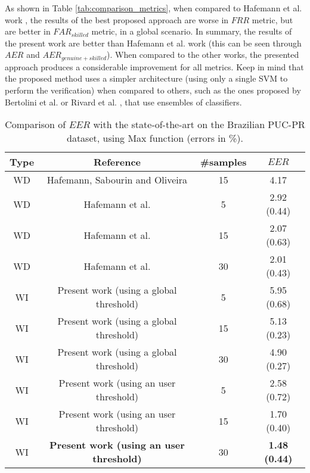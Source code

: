 \documentclass[conference]{IEEEtran}
\begin{document}
As shown in Table \ref{tab:comparison_metrics}, when compared to Hafemann et al. work \cite{hafemann:17}, the results of the best proposed approach are worse in $FRR$ metric, but are better in  $FAR_{skilled}$ metric, in a global scenario. In summary, the results of the present work are better than Hafemann et al. work \cite{hafemann:17} (this can be seen through $AER$ and $AER_{genuine+skilled}$). 
When compared to the other works, the presented approach produces a considerable improvement for all metrics. Keep in mind that the proposed method uses a simpler architecture (using only a single SVM to perform the verification) when compared to others, such as the ones proposed by Bertolini et al. \cite{bertolini:10} or Rivard et al. \cite{rivard:13}, that use ensembles of classifiers.


\begin{table}[!htb]
\caption{Comparison of $EER$ with the state-of-the-art on the Brazilian PUC-PR dataset, using Max function (errors in \%).}
\label{tab:comparison_ERR_userthreshold}
\scriptsize
\centering

\begin{tabular}{cccc}
\hline
Type & Reference & \#samples & $EER$ \\ 
\hline
WD & Hafemann, Sabourin and Oliveira \cite{hafemann:16} & 15  &  4.17 \\ 
WD & Hafemann et al. \cite{hafemann:17} & 5  &  2.92 (0.44) \\ 
WD & Hafemann et al. \cite{hafemann:17} & 15  &  2.07 (0.63) \\ 
WD & Hafemann et al. \cite{hafemann:17} & 30  &  2.01 (0.43) \\ 
WI & Present work (using a global threshold) & 5 & 5.95 (0.68) \\
WI & Present work (using a global threshold) & 15 & 5.13 (0.23) \\
WI & Present work (using a global threshold) & 30 & 4.90 (0.27) \\ 
WI & Present work (using an user threshold)  & 5 & 2.58 (0.72) \\ 
WI & Present work (using an user threshold)  & 15 & 1.70 (0.40) \\ 
WI & \textbf{Present work (using an user threshold)}  & 30 & \textbf{1.48 (0.44)} \\ 
\hline

\end{tabular}
\end{table}
\end{document}
